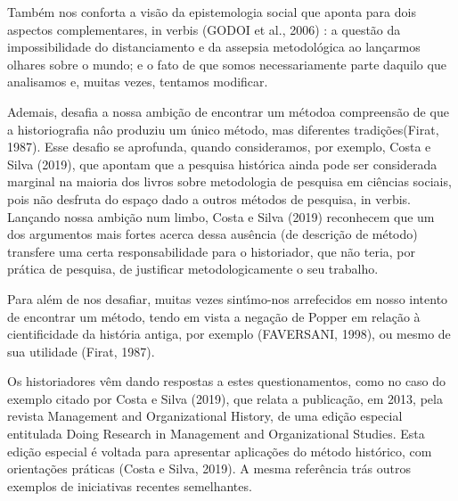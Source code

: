 \documentclass[
12pt,		%
openright,	%
twoside,  %
a4paper,			%
chapter=TITLE,		%
english,			%
french,				%
spanish,			%
brazil				%
]{USPSC-classe/USPSC}
\begin{document}
Tamb\'em nos conforta a vis\~ao da epistemologia social que aponta para dois aspectos complementares, in verbis  (GODOI et al., 2006) : \textquotedbl a quest\~ao da impossibilidade do distanciamento e da assepsia metodol\'ogica ao lan\c{c}armos olhares sobre o mundo; e o fato de que somos necessariamente parte daquilo que analisamos e, muitas vezes, tentamos modificar\textquotedbl .










Ademais, desafia a nossa ambi\c{c}\~ao de \textquotedbl encontrar um m\'etodo\textquotedbl  a compreens\~ao de que a \textquotedbl historiografia n\^ao produziu um \'unico m\'etodo, mas diferentes tradi\c{c}\~oes\textquotedbl   (Firat, 1987).  Esse desafio se aprofunda, quando consideramos, por exemplo, Costa e Silva (2019), que apontam que a \textquotedbl pesquisa hist\'orica ainda pode ser considerada marginal na maioria dos livros sobre metodologia de pesquisa em ci\^encias sociais, pois n\~ao desfruta do espa\c{c}o dado a outros m\'etodos de pesquisa\textquotedbl , in verbis. Lan\c{c}ando nossa ambi\c{c}\~ao num limbo,  Costa e Silva (2019) reconhecem \textquotedbl que um dos argumentos mais fortes acerca dessa aus\^encia (de descri\c{c}\~ao de m\'etodo) transfere uma certa responsabilidade para o historiador, que n\~ao teria, por pr\'atica de pesquisa, de justificar metodologicamente o seu trabalho\textquotedbl .










Para al\'em de nos desafiar, muitas vezes sint\'{\i}mo-nos arrefecidos em nosso intento de \textquotedbl encontrar um m\'etodo\textquotedbl , tendo em vista a nega\c{c}\~ao de Popper em rela\c{c}\~ao \`a cientificidade da hist\'oria antiga, por exemplo (FAVERSANI, 1998), ou mesmo de sua utilidade (Firat, 1987).










Os historiadores v\^em dando respostas a estes questionamentos, como no caso do exemplo citado por  Costa e Silva (2019), que relata a publica\c{c}\~ao, em 2013, pela revista \textquotedbl Management and Organizational History\textquotedbl , de uma edi\c{c}\~ao especial entitulada \textquotedbl Doing Research in Management and Organizational Studies\textquotedbl . Esta edi\c{c}\~ao especial \'e voltada para apresentar aplica\c{c}\~oes do m\'etodo hist\'orico, com orienta\c{c}\~oes pr\'aticas  (Costa e Silva, 2019). A mesma refer\^encia tr\'as outros exemplos de iniciativas recentes semelhantes.
\end{document}
